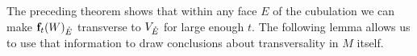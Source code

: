 \begin{comment}

	AROUND HERE IS WHERE THINGS STILL NEED TO BE FIXED UP.

	Similarly, consider a $\zeta > 0$ small enough so that the closed $L^\infty$ neighborhood $\overline N_\zeta(F^-)$ of $F^-$ is such that either $W_E \cap \overline N_\zeta(F^-) = \emptyset$ or for any $x \in W_E \cap \overline N_\zeta(F^-)$ the affine space $T_xW_E$ is transverse to the span of $\beta_{F^-} = \{\e_i\ |\ i \in F^-_{01}\}$ at $x$.
	In the latter case, for every such $x$, the transversality implies that $T_xW_E$ projects surjectively onto $F$; in other words, the projection of $W_E \cap \overline N_\zeta(F^-)$ to $F$ is a submersion onto its image.
	Therefore, we may choose continuously with $x$ a subset of $T_xW_E$ of the form $\beta_x = \{\e_j + v_j\ |\ j \in F_{01}\}$ such that $v_j$ is in the span of $\beta_{F^-}$.
	As $W_E \cap \overline N_\zeta(F^-)$ is compact, the $v_j$ have bounded norm.

	By possibly making $\delta$ smaller we can choose $u \in (0, 1)$ by inductive hypothesis such that $\overline N_\delta(F) \setminus \overline N_\delta L_u(F)$ is contained in $\mathcal N^{i-1}$.

	By \cref{L:flow to initial and terminal faces} we may choose $t > T^{i-1}$ sufficiently large so that all points in $\f_t(W_E) \cap V_E \cap \overline N_\delta L_u(F)$ are of the form $y = \f_t(x)$ for some $x \in W_E \cap \overline N_\zeta(F^-)$.

	We use \cref{L:jacobian ratios} to deduce that the push forward of the span of $\beta_x$ along $D\,\f_t$ is as close as desired to the span of $\beta_F$ at $y$ and is therefore transverse to $T_y V_E$.
	The induction step is completed by taking $\mathcal N^i$ to be the union over all terminal faces of $N_\delta(F)$ and $T^i$ the maximum value of their associated $t$.

	\end{comment}


The preceding theorem shows that within any face $E$ of the cubulation we can make $\mathbf{f}_t(W)_{\mathring{E}}$ transverse to $V_{\mathring{E}}$ for large enough $t$.
The following lemma allows us to use that information to draw conclusions about transversality in $M$ itself.


